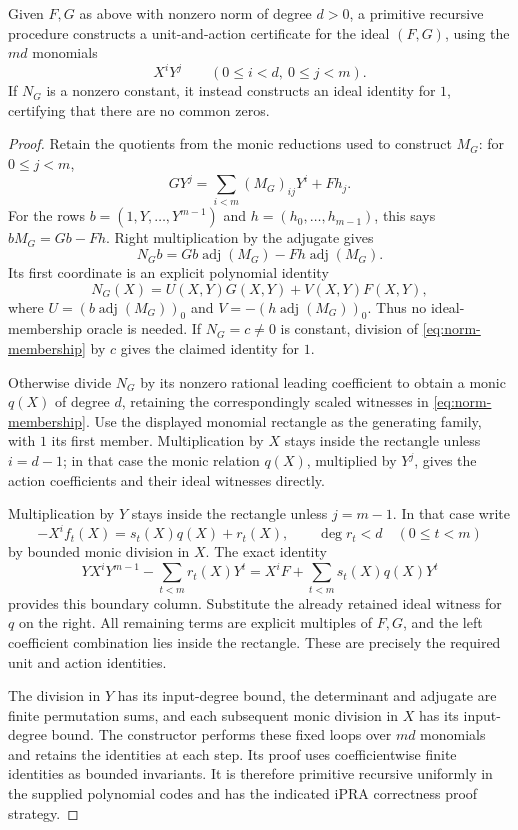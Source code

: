 \begin{proposition}
\label{prop:norm-to-module}
Given \(F,G\) as above with nonzero norm of degree \(d>0\), a
primitive recursive procedure constructs a unit-and-action certificate
for the ideal \((F,G)\), using the \(md\) monomials
\[
             X^iY^j\qquad(0\le i<d,\ 0\le j<m).
\]
If \(N_G\) is a nonzero constant, it instead constructs an ideal
identity for \(1\), certifying that there are no common zeros.
\end{proposition}

\begin{proof}
Retain the quotients from the monic reductions used to construct
\(M_G\): for \(0\le j<m\),
\[
 GY^j=\sum_{i<m}(M_G)_{ij}Y^i+Fh_j.
\]
For the rows \(b=(1,Y,\ldots,Y^{m-1})\) and
\(h=(h_0,\ldots,h_{m-1})\), this says
\(bM_G=Gb-Fh\).  Right multiplication by the adjugate gives
\[
 N_G b=G b\operatorname{adj}(M_G)
           -Fh\operatorname{adj}(M_G).
\]
Its first coordinate is an explicit polynomial identity
\[
 N_G(X)=U(X,Y)G(X,Y)+V(X,Y)F(X,Y),
 \tag{NM}\label{eq:norm-membership}
\]
where \(U=(b\operatorname{adj}(M_G))_0\) and
\(V=-(h\operatorname{adj}(M_G))_0\).  Thus no ideal-membership
oracle is needed.  If \(N_G=c\ne0\) is constant, division of
\eqref{eq:norm-membership} by \(c\) gives the claimed identity
for \(1\).

Otherwise divide \(N_G\) by its nonzero rational leading
coefficient to obtain a monic \(q(X)\) of degree \(d\), retaining
the correspondingly scaled witnesses in \eqref{eq:norm-membership}.
Use the displayed monomial rectangle as the generating family, with
\(1\) its first member.  Multiplication by \(X\) stays inside
the rectangle unless \(i=d-1\); in that case the monic relation
\(q(X)\), multiplied by \(Y^j\), gives the action coefficients
and their ideal witnesses directly.

Multiplication by \(Y\) stays inside the rectangle unless
\(j=m-1\).  In that case write
\[
 -X^i f_t(X)=s_t(X)q(X)+r_t(X),\qquad \deg r_t<d
 \quad(0\le t<m)
\]
by bounded monic division in \(X\).  The exact identity
\[
 YX^iY^{m-1}-\sum_{t<m}r_t(X)Y^t
       =X^iF+\sum_{t<m}s_t(X)q(X)Y^t
\]
provides this boundary column.  Substitute the already retained ideal
witness for \(q\) on the right.  All remaining terms are explicit
multiples of \(F,G\), and the left coefficient combination lies
inside the rectangle.  These are precisely the required unit and
action identities.

The division in \(Y\) has its input-degree bound, the determinant
and adjugate are finite permutation sums, and each subsequent monic
division in \(X\) has its input-degree bound.  The constructor
performs these fixed loops over \(md\) monomials and retains the
identities at each step.  Its proof uses coefficientwise finite
identities as bounded invariants.  It is therefore primitive recursive
uniformly in the supplied polynomial codes and has the indicated
iPRA correctness proof strategy.
\end{proof}

